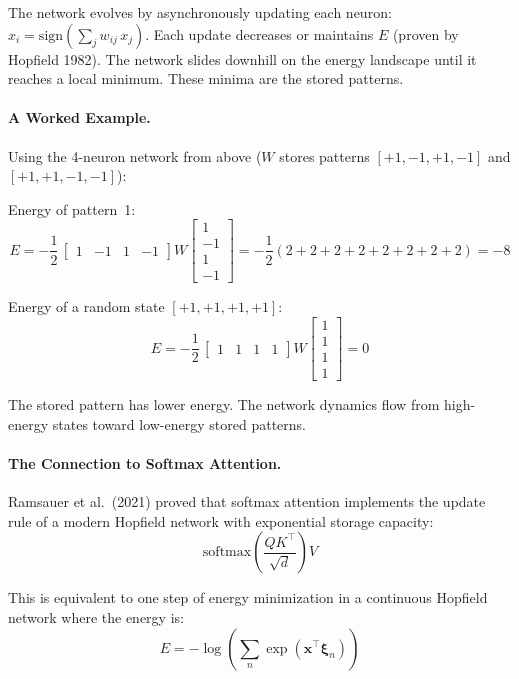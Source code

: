 \documentclass[11pt,a4paper]{article}
\begin{document}
The network evolves by asynchronously updating each neuron: $x_i = \mathrm{sign}\!\left(\sum_j w_{ij}\, x_j\right)$. Each update decreases or maintains $E$ (proven by Hopfield 1982). The network slides downhill on the energy landscape until it reaches a local minimum. These minima are the stored patterns.

\paragraph{A Worked Example.}

Using the 4-neuron network from above ($W$ stores patterns $[+1,-1,+1,-1]$ and $[+1,+1,-1,-1]$):

Energy of pattern~1:
\[
  E = -\frac{1}{2}\,
      \begin{bmatrix}1&-1&1&-1\end{bmatrix}
      W
      \begin{bmatrix}1\\-1\\1\\-1\end{bmatrix}
    = -\frac{1}{2}(2{+}2{+}2{+}2{+}2{+}2{+}2{+}2) = -8
\]

Energy of a random state $[+1,+1,+1,+1]$:
\[
  E = -\frac{1}{2}\,
      \begin{bmatrix}1&1&1&1\end{bmatrix}
      W
      \begin{bmatrix}1\\1\\1\\1\end{bmatrix}
    = 0
\]

The stored pattern has lower energy. The network dynamics flow from high-energy states toward low-energy stored patterns.

\paragraph{The Connection to Softmax Attention.}

Ramsauer et al.\ (2021) proved that softmax attention implements the update rule of a modern Hopfield network with exponential storage capacity:
\[
  \mathrm{softmax}\!\left(\frac{QK^\top}{\sqrt{d}}\right) V
\]

This is equivalent to one step of energy minimization in a continuous Hopfield network where the energy is:
\[
  E = -\log\!\left(\sum_n \exp\!\left(\mathbf{x}^\top \boldsymbol{\xi}_n\right)\right)
\]
\end{document}
